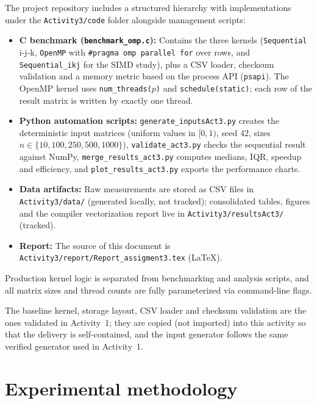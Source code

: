 \documentclass[12pt,a4paper]{article}
\begin{document}
The project repository includes a structured hierarchy with implementations
under the \texttt{Activity3/code} folder alongside management scripts:
\begin{itemize}
\item \textbf{C benchmark (\texttt{benchmark\_omp.c}):} Contains the three
kernels (\texttt{Sequential} i-j-k, \texttt{OpenMP} with
\texttt{\#pragma omp parallel for} over rows, and \texttt{Sequential\_ikj}
for the SIMD study), plus a CSV loader, checksum validation and a memory
metric based on the process API (\texttt{psapi}). The OpenMP kernel
uses \texttt{num\_threads($p$)} and \texttt{schedule(static)}; each row of
the result matrix is written by exactly one thread.
\item \textbf{Python automation scripts:} \texttt{generate\_inputsAct3.py}
creates the deterministic input matrices (uniform values in $[0,1)$, seed
42, sizes $n \in \{10, 100, 250, 500, 1000\}$), \texttt{validate\_act3.py}
checks the
sequential result against NumPy, \texttt{merge\_results\_act3.py} computes
medians, IQR, speedup and efficiency, and \texttt{plot\_results\_act3.py}
exports the performance charts.
\item \textbf{Data artifacts:} Raw measurements are stored as CSV files in
\texttt{Activity3/data/} (generated locally, not tracked); consolidated
tables, figures and the compiler vectorization report live in
\texttt{Activity3/resultsAct3/} (tracked).
\item \textbf{Report:} The source of this document is
\texttt{Activity3/report/Report\_assigment3.tex} (LaTeX).
\end{itemize}

Production kernel logic is separated from benchmarking and analysis
scripts, and all matrix sizes and thread counts are fully parameterized via
command-line flags.

The baseline kernel, storage layout, CSV loader and checksum validation are
the ones validated in Activity~1; they are copied (not imported) into this
activity so that the delivery is self-contained, and the input generator
follows the same verified generator used in Activity~1.

\section{Experimental methodology}
\label{sec:method}
\end{document}

